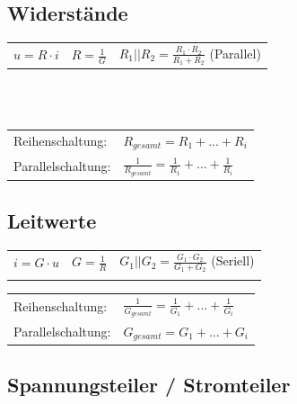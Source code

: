 \documentclass[a4paper,twocolumn,10pt]{article}
\begin{document}
\subsection*{Widerstände}
\begin{tabular}{lll}
$u=R\cdot i$ & $R=\frac{1}{G}$ & $R_1||R_2 = \frac{R_1\cdot R_2}{R_1+R_2}$ (Parallel)
\end{tabular}\\\\
\begin{tabular}{ll}
Reihenschaltung: & $R_{gesamt}=R_1+...+R_i$\\
Parallelschaltung: & $\frac{1}{R_{gesamt}}=\frac{1}{R_1}+...+\frac{1}{R_i}$ 
\end{tabular}

\subsection*{Leitwerte}
\begin{tabular}{lll}
$i=G\cdot u$ & $G=\frac{1}{R}$ & $G_1||G_2 = \frac{G_1\cdot G_2}{G_1+G_2}$ (Seriell)\\ & & \\
\end{tabular}
\begin{tabular}{ll}
Reihenschaltung: & $\frac{1}{G_{gesamt}}=\frac{1}{G_1}+...+\frac{1}{G_i}$\\
Parallelschaltung: & $G_{gesamt}=G_1+...+G_i$
\end{tabular}

\subsection*{Spannungsteiler / Stromteiler}
\end{document}
